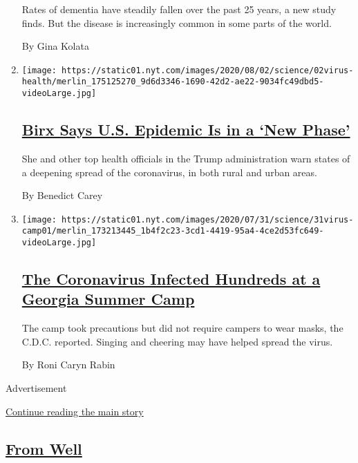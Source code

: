 \begin{enumerate}
  Rates of dementia have steadily fallen over the past 25 years, a new
  study finds. But the disease is increasingly common in some parts of
  the world.

  By Gina Kolata
\item
  \texttt{[image: https://static01.nyt.com/images/2020/08/02/science/02virus-health/merlin\_175125270\_9d6d3346-1690-42d2-ae22-9034fc49dbd5-videoLarge.jpg]}

  \hypertarget{birx-says-us-epidemic-is-in-a-new-phase}{%
  \subsection{\texorpdfstring{\href{/2020/08/02/health/dr-birx-coronavirus-phase.html}{Birx
  Says U.S. Epidemic Is in a `New
  Phase'}}{Birx Says U.S. Epidemic Is in a `New Phase'}}\label{birx-says-us-epidemic-is-in-a-new-phase}}

  She and other top health officials in the Trump administration warn
  states of a deepening spread of the coronavirus, in both rural and
  urban areas.

  By Benedict Carey
\item
  \texttt{[image: https://static01.nyt.com/images/2020/07/31/science/31virus-camp01/merlin\_173213445\_1b4f2c23-3cd1-4419-95a4-4ce2d53fc649-videoLarge.jpg]}

  \hypertarget{the-coronavirus-infected-hundreds-at-a-georgia-summer-camp}{%
  \subsection{\texorpdfstring{\href{/2020/07/31/health/coronavirus-children-camp.html}{The
  Coronavirus Infected Hundreds at a Georgia Summer
  Camp}}{The Coronavirus Infected Hundreds at a Georgia Summer Camp}}\label{the-coronavirus-infected-hundreds-at-a-georgia-summer-camp}}

  The camp took precautions but did not require campers to wear masks,
  the C.D.C. reported. Singing and cheering may have helped spread the
  virus.

  By Roni Caryn Rabin
\end{enumerate}

Advertisement

\protect\hyperlink{after-mid1}{Continue reading the main story}

\hypertarget{from-well}{%
\subsection{\texorpdfstring{\href{/section/well}{From
Well}}{From Well}}\label{from-well}}

